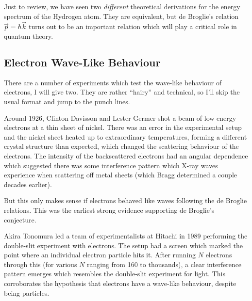 \begin{remark}
Just to review, we have seen two \emph{different} theoretical
derivations for the energy spectrum of the Hydrogen atom. They are
equivalent, but de Broglie's relation $\vec{p}=\hbar\vec{k}$ turns out
to be an important relation which will play a critical role in quantum
theory. 
\end{remark}

\subsection{Electron Wave-Like Behaviour}

\M
There are a number of experiments which test the wave-like behaviour of
electrons, I will give two. They are rather ``hairy'' and technical, so
I'll skip the usual format and jump to the punch lines.

Around 1926,
Clinton Davisson and Lester Germer shot a beam of low energy electrons
at a thin sheet of nickel. There was an error in the experimental setup
and the nickel sheet heated up to extraordinary temperatures, forming a
different crystal structure than expected, which changed the scattering
behaviour of the electrons. The intensity of the backscattered electrons
had an angular dependence which suggested there was some interference
pattern which X-ray waves experience when scattering off metal sheets
(which Bragg determined a couple decades earlier).

But this only makes sense if electrons behaved like waves following the
de Broglie relations. This was the earliest strong evidence supporting
de Broglie's conjecture.

Akira Tonomura led a team of experimentalists at Hitachi in 1989
performing the double-slit experiment with electrons. The setup had a
screen which marked the point where an individual electron particle hits
it. After running $N$ electrons through this (for various $N$ ranging
from 160 to thousands), a clear interference pattern emerges which
resembles the double-slit experiment for light. This corroborates the
hypothesis that electrons have a wave-like behaviour, despite being
particles. 

